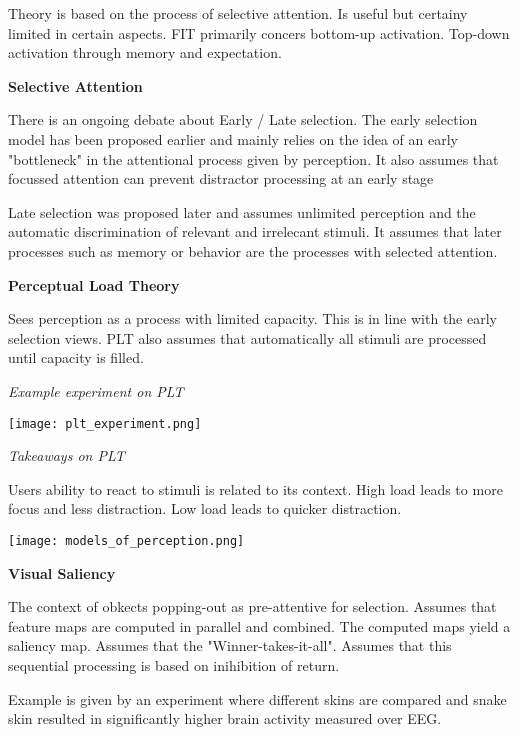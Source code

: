Theory is based on the process of selective attention. Is useful but certainy limited in certain aspects. FIT primarily concers bottom-up activation. Top-down activation through memory and expectation. \medskip

\textbf{Selective Attention} \smallskip

There is an ongoing debate about Early / Late selection. The early selection model has been proposed earlier and mainly relies on the idea of an early "bottleneck" in the attentional process given by perception. 
It also assumes that focussed attention can prevent distractor processing at an early stage\medskip

Late selection was proposed later and assumes unlimited perception and the automatic discrimination of relevant and irrelecant stimuli. 
It assumes that later processes such as memory or behavior are the processes with selected attention. \medskip

\textbf{Perceptual Load Theory} \smallskip

Sees perception as a process with limited capacity. This is in line with the early selection views. PLT also assumes that automatically all stimuli are processed until capacity is filled. \smallskip

\textit{Example experiment on PLT}
\begin{center}
	\texttt{[image: plt\_experiment.png]}
\end{center}

\textit{Takeaways on PLT}

Users ability to react to stimuli is related to its context. High load leads to more focus and less distraction. Low load leads to quicker distraction.\medskip

\begin{center}
	\texttt{[image: models\_of\_perception.png]}
\end{center}

\textbf{Visual Saliency} \smallskip

The context of obkects popping-out as pre-attentive for selection. Assumes that feature maps are computed in parallel and combined. The computed maps yield a saliency map. Assumes that the "Winner-takes-it-all".
Assumes that this sequential processing is based on inihibition of return. \medskip

Example is given by an experiment where different skins are compared and snake skin resulted in significantly higher brain activity measured over EEG. \smallskip

